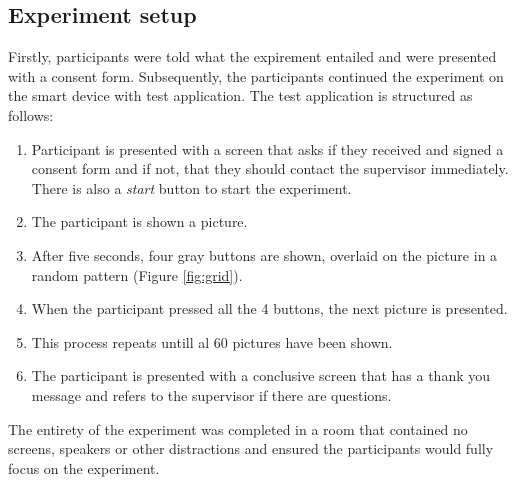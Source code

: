 \documentclass{sigchi}
\begin{document}

\subsection{Experiment setup} %
\label{sub:experiment_setup}
Firstly, participants were told what the expirement entailed and were presented with a consent form. Subsequently, the participants continued the experiment on the smart device with test application. The test application is structured as follows:
\begin{enumerate}
  \item Participant is presented with a screen that asks if they received and signed a consent form and if not, that they should contact the supervisor immediately. There is also a \textit{start} button to start the experiment.
  \item The participant is shown a picture.
  \item After five seconds, four gray buttons are shown, overlaid on the picture in a random pattern (Figure \ref{fig:grid}).
  \item When the participant pressed all the 4 buttons, the next picture is presented.
  \item This process repeats untill al 60 pictures have been shown.
  \item The participant is presented with a conclusive screen that has a thank you message and refers to the supervisor if there are questions.
\end{enumerate}

The entirety of the experiment was completed in a room that  contained no screens, speakers or other distractions and ensured the participants would fully focus on the experiment.
\end{document}
